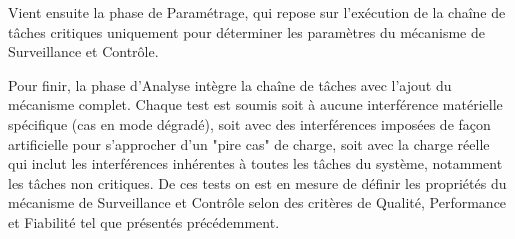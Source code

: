 \documentclass[french, a4paper, 11pt, twoside, pdftex]{StyleThese}
\begin{document}
   	Vient ensuite la phase de Paramétrage, qui repose sur l'exécution de la chaîne de tâches critiques uniquement pour déterminer les paramètres du mécanisme de Surveillance et Contrôle.
   	
   	Pour finir, la phase d'Analyse intègre la chaîne de tâches avec l'ajout du mécanisme complet. Chaque test est soumis soit à aucune interférence matérielle spécifique (cas en mode dégradé), soit avec des interférences imposées de façon artificielle pour s'approcher d'un "pire cas" de charge, soit avec la charge réelle qui inclut les interférences inhérentes à toutes les tâches du système, notamment les tâches non critiques. De ces tests on est en mesure de définir les propriétés du mécanisme de Surveillance et Contrôle selon des critères de Qualité, Performance et Fiabilité tel que présentés précédemment. 
   	

   	
\ifdefined{}
\else


\end{document}
